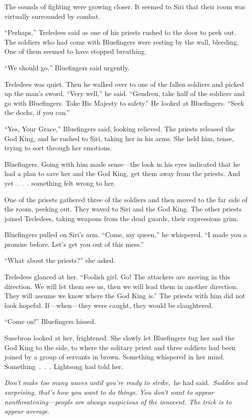 The sounds of fighting were growing closer. It seemed to Siri that their room was virtually surrounded by combat.

“Perhaps,” Treledees said as one of his priests rushed to the door to peek out. The soldiers who had come with Bluefingers were resting by the wall, bleeding. One of them seemed to have stopped breathing.

“We should go,” Bluefingers said urgently.

Treledees was quiet. Then he walked over to one of the fallen soldiers and picked up the man’s sword. “Very well,” he said. “Gendren, take half of the soldiers and go with Bluefingers. Take His Majesty to safety.” He looked at Bluefingers. “Seek the docks, if you can.”

“Yes, Your Grace,” Bluefingers said, looking relieved. The priests released the God King, and he rushed to Siri, taking her in his arms. She held him, tense, trying to sort through her emotions.

Bluefingers. Going with him made sense—the look in his eyes indicated that he had a plan to save her and the God King, get them away from the priests. And yet~.~.~. something felt wrong to her.

One of the priests gathered three of the soldiers and then moved to the far side of the room, peeking out. They waved to Siri and the God King. The other priests joined Treledees, taking weapons from the dead guards, their expressions grim.

Bluefingers pulled on Siri’s arm. “Come, my queen,” he whispered. “I made you a promise before. Let’s get you out of this mess.”

“What about the priests?” she asked.

Treledees glanced at her. “Foolish girl. Go! The attackers are moving in this direction. We will let them see us, then we will lead them in another direction. They will assume we know where the God King is.” The priests with him did not look hopeful. If—when—they were caught, they would be slaughtered.

“Come on!” Bluefingers hissed.

Susebron looked at her, frightened. She slowly let Bluefingers tug her and the God King to the side, to where the solitary priest and three soldiers had been joined by a group of servants in brown. Something whispered in her mind. Something~.~.~. Lightsong had told her.

\textit{Don’t make too many waves until you’re ready to strike,}~he had said.~\textit{Sudden and surprising, that’s how you want to do things. You don’t want to appear nonthreatening—people are always suspicious of the innocent. The trick is to appear average.}

